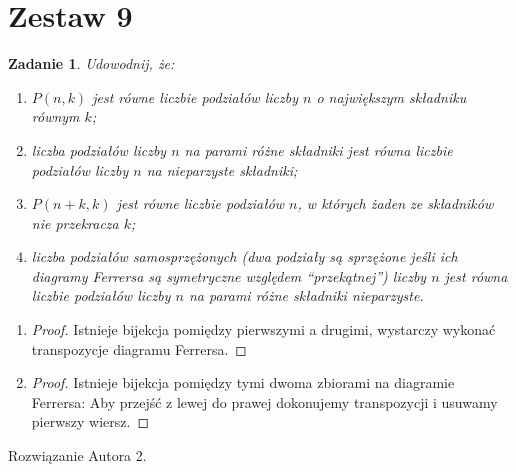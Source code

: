 \documentclass{mwart}
\newtheorem{zad}{Zadanie}[section]
\begin{document}
\section{Zestaw 9}          %
\begin{zad}
    Udowodnij, że:
    \begin{enumerate}
        \item  $P(n, k)$ jest równe liczbie podziałów liczby $n$ o największym składniku równym $k$;
        \item liczba podziałów liczby $n$ na parami różne składniki jest równa liczbie podziałów liczby $n$ na nieparzyste składniki;
        \item $P(n + k, k)$ jest równe liczbie podziałów $n$, w których żaden ze składników nie przekracza $k$;
        \item liczba podziałów samosprzężonych (dwa podziały są sprzężone jeśli ich diagramy Ferrersa są symetryczne względem “przekątnej”) liczby $n$ jest równa liczbie podziałów liczby $n$ na parami różne składniki nieparzyste.
    \end{enumerate}
\end{zad}
\begin{mdframed}
    \begin{enumerate}
        \item
              \begin{proof}
                  Istnieje bijekcja pomiędzy pierwszymi a drugimi, wystarczy wykonać transpozycje diagramu Ferrersa.
              \end{proof}

        \item
              \begin{proof}
                  Istnieje bijekcja pomiędzy tymi dwoma zbiorami na diagramie Ferrersa:
                  Aby przejść z lewej do prawej dokonujemy transpozycji i usuwamy pierwszy wiersz.
              \end{proof}

    \end{enumerate}
\end{mdframed}
\begin{mdframed}
    Rozwiązanie Autora 2.
\end{mdframed}
\end{document}
